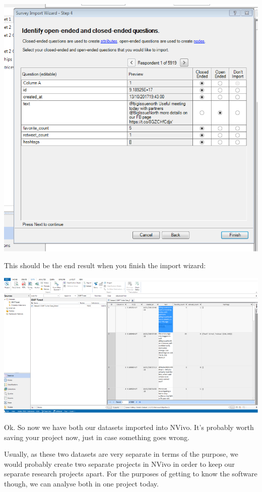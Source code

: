 \documentclass[
]{book}
\begin{document}
\includegraphics{imgs/identify_open_close.png}

This should be the end result when you finish the import wizard:

\includegraphics{imgs/import_wizard2.png}

Ok. So now we have both our datasets imported into NVivo. It's probably worth saving your project now, just in case something goes wrong.

Usually, as these two datasets are very separate in terms of the purpose, we would probably create two separate projects in NVivo in order to keep our separate research projects apart. For the purposes of getting to know the software though, we can analyse both in one project today.
\end{document}
